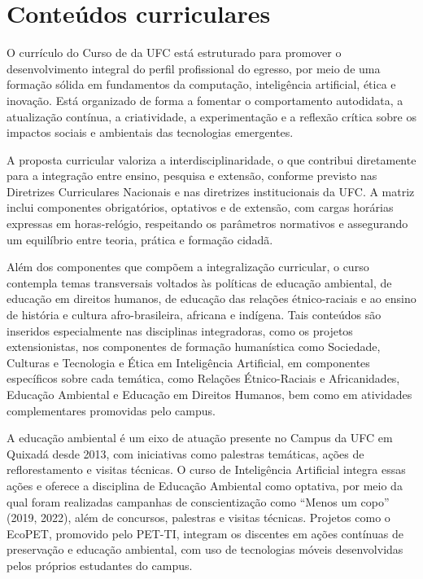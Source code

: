 \section{Conteúdos curriculares}

O currículo do Curso de \nomedocurso da UFC está estruturado para promover o desenvolvimento integral do perfil profissional do egresso, por meio de uma formação sólida em fundamentos da computação, inteligência artificial, ética e inovação. Está organizado de forma a fomentar o comportamento autodidata, a atualização contínua, a criatividade, a experimentação e a reflexão crítica sobre os impactos sociais e ambientais das tecnologias emergentes.

A proposta curricular valoriza a interdisciplinaridade, o que contribui diretamente para a integração entre ensino, pesquisa e extensão, conforme previsto nas Diretrizes Curriculares Nacionais e nas diretrizes institucionais da UFC. A matriz inclui componentes obrigatórios, optativos e de extensão, com cargas horárias expressas em horas-relógio, respeitando os parâmetros normativos e assegurando um equilíbrio entre teoria, prática e formação cidadã.

Além dos componentes que compõem a integralização curricular, o curso contempla temas transversais voltados às políticas de educação ambiental, de educação em direitos humanos, de educação das relações étnico-raciais e ao ensino de história e cultura afro-brasileira, africana e indígena. Tais conteúdos são inseridos especialmente nas disciplinas integradoras, como os projetos extensionistas, nos componentes de formação humanística como Sociedade, Culturas e Tecnologia e Ética em Inteligência Artificial, em componentes específicos sobre cada temática, como Relações Étnico-Raciais e Africanidades, Educação Ambiental e Educação em Direitos Humanos, bem como em atividades complementares promovidas pelo campus.

A educação ambiental é um eixo de atuação presente no Campus da UFC em Quixadá desde 2013, com iniciativas como palestras temáticas, ações de reflorestamento e visitas técnicas. O curso de Inteligência Artificial integra essas ações e oferece a disciplina de Educação Ambiental como optativa, por meio da qual foram realizadas campanhas de conscientização como “Menos um copo” (2019, 2022), além de concursos, palestras e visitas técnicas. Projetos como o EcoPET, promovido pelo PET-TI, integram os discentes em ações contínuas de preservação e educação ambiental, com uso de tecnologias móveis desenvolvidas pelos próprios estudantes do campus.

